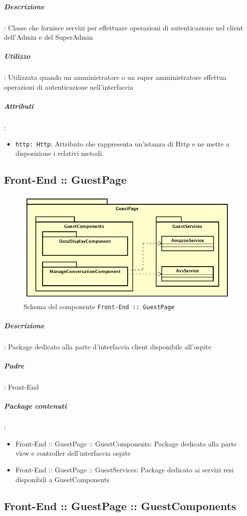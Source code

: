 \documentclass[../ManualeSviluppatore_v1.0.0.tex]{subfiles}
\begin{document}
				\subparagraph{Descrizione}: Classe che fornisce servizi per effettuare operazioni di autenticazione nel client dell'Admin e del SuperAdmin
				\subparagraph{Utilizzo}: Utilizzata quando un amministratore o un super amministratore effettua operazioni di autenticazione nell'interfaccia
				\subparagraph{Attributi}:
				\begin{itemize}
					\item \texttt{http: Http}: Attributo che rappresenta un'istanza di Http e ne mette a disposizione i relativi metodi.
				\end{itemize}
	\newpage
	\subsection{Front-End :: GuestPage}
	\begin{figure}[!h]
		\centering
		\includegraphics[scale=0.6]{Architettura/Front-End/GuestPage/GuestPage.png}
		\caption{Schema del componente \texttt{Front-End :: GuestPage}}
	\end{figure}

			\subparagraph{Descrizione}: Package dedicato alla parte d'interfaccia client disponibile all'ospite
			\subparagraph{Padre}: Front-End
			\subparagraph{Package contenuti}:
			\begin{itemize}
				\item Front-End :: GuestPage :: GuestComponents: Package dedicato alla parte view e controller dell'interfaccia ospite
				\item Front-End :: GuestPage :: GuestServices: Package dedicato ai servizi resi disponibili a GuestComponents
			\end{itemize}


	\newpage
	\subsection{Front-End :: GuestPage :: GuestComponents}
\end{document}

